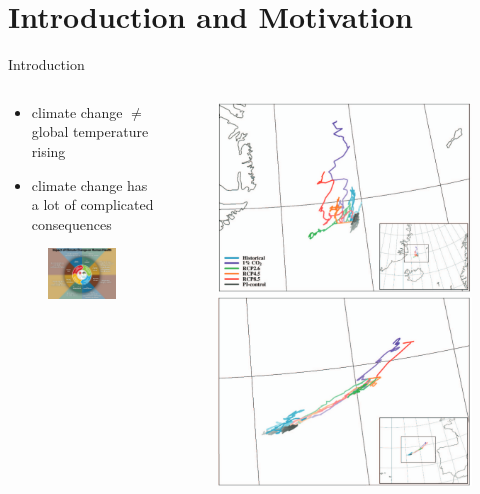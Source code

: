 \section[Intro]{Introduction and Motivation}
\begin{frame}{Introduction}
\begin{columns}
  \begin{column}{.5 \textwidth}
    \begin{itemize}
      \item climate change $\neq$ global temperature rising 
      \item climate change has a lot of complicated consequences 
    \end{itemize}
    
    \begin{figure}[t]
      \centering
      \includegraphics[width=.5 \columnwidth]{imglib/climate_change_health_impacts.jpg}
    \end{figure}
    
  \end{column}
  \begin{column}{.5 \textwidth}
    \begin{figure}[t]
      \centering
      \includegraphics[width=.6 \columnwidth]{imglib/nao_mov_island.png}
      \includegraphics[width=.6 \columnwidth]{imglib/nao_mov_azore.png}
    \end{figure}
    

\end{column}
\end{columns}
\end{frame}
